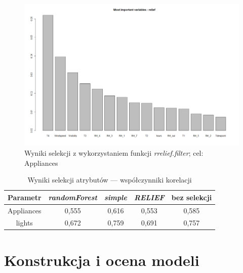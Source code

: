 \documentclass[a4paper,11pt,twoside]{mwrep}  %
\begin{document}
 \begin{figure}[!h]
    \centering \includegraphics[scale=0.4]{../relief_app.png}
    \caption{Wyniki selekcji z wykorzystaniem  funkcji \textit{rrelief.filter}; cel: Appliances}
    \label{fig:relief_app}
\end{figure}


\begin{table}[!h]  \centering
\caption{Wyniki selekcji atrybutów --- współczynniki korelacji}
\begin{tabular} { c  c  c  c  c } \hline \hline
    \textbf{Parametr} & \textbf{\textit{randomForest}} & \textbf{\textit{simple}} & \textbf{\textit{RELIEF}} & \textbf{bez selekcji}  \\ \hline
    Appliances & 0,555 & 0,616 & 0,553 & 0,585 \\
    lights & 0,672 & 0,759 & 0,691 & 0,757 \\
    \hline \hline
    
\end{tabular}
\label{table:wynikiSelekcji}
\end{table}

\endgroup

\clearpage
\begingroup
\let\clearpage\relax
\chapter{Konstrukcja i ocena modeli}
\end{document}
